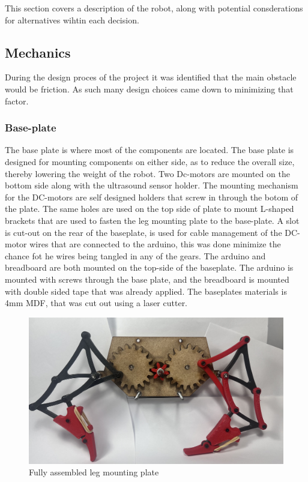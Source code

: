 

This section covers a description of the robot, along with potential consderations for alternatives wihtin each decision.
\subsection{Mechanics}
During the design proces of the project it was identified that the main obstacle would be friction. As such many design choices came down to minimizing that factor. 
\subsubsection{Base-plate}
The base plate is where most of the components are located. The base plate is designed for mounting components on either side, as to reduce the overall size, thereby lowering the weight of the robot. Two Dc-motors are mounted on the bottom side along with the ultrasound sensor holder. The mounting mechanism for the DC-motors are self designed holders that screw in through the botom of the plate. The same holes are used on the top side of plate to mount L-shaped brackets that are used to fasten the leg mounting plate to the base-plate. A slot is cut-out on the rear of the baseplate, is used for cable management of the DC-motor wires that are connected to the arduino, this was done minimize the chance fot he wires being tangled in any of the gears. The arduino and breadboard are both mounted on the top-side of the baseplate. The arduino is mounted with screws through the base plate, and the breadboard is mounted with double sided tape that was already applied. The baseplates materials is 4mm MDF, that was cut out using a laser cutter. \\
\begin{figure} [!htb]
    \centering
    \includegraphics[width=1\linewidth]{images/LMA.jpeg}       
    \caption{Fully assembled leg mounting plate}
    \label{fig:leg_mount_plate}
\end{figure}
